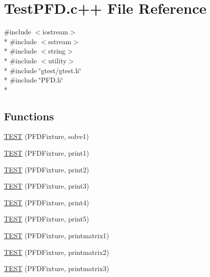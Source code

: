 \hypertarget{TestPFD_8c_09_09}{\section{Test\-P\-F\-D.\-c++ File Reference}
\label{TestPFD_8c_09_09}
}
{\ttfamily \#include $<$iostream$>$}\\*
{\ttfamily \#include $<$sstream$>$}\\*
{\ttfamily \#include $<$string$>$}\\*
{\ttfamily \#include $<$utility$>$}\\*
{\ttfamily \#include \char`\"{}gtest/gtest.\-h\char`\"{}}\\*
{\ttfamily \#include \char`\"{}P\-F\-D.\-h\char`\"{}}\\*
\subsection*{Functions}
\begin{DoxyCompactItemize}
\item 
\hyperlink{TestPFD_8c_09_09_a306e0708d1b40dc0bb6011c54592bb4b}{T\-E\-S\-T} (P\-F\-D\-Fixture, solve1)
\item 
\hyperlink{TestPFD_8c_09_09_a31e2a4aea0a1176053cc53d6d2eac815}{T\-E\-S\-T} (P\-F\-D\-Fixture, print1)
\item 
\hyperlink{TestPFD_8c_09_09_a203f84029df1bcedd6218ffd828581b0}{T\-E\-S\-T} (P\-F\-D\-Fixture, print2)
\item 
\hyperlink{TestPFD_8c_09_09_a72e0ff436e0533faecf551c4cc77adad}{T\-E\-S\-T} (P\-F\-D\-Fixture, print3)
\item 
\hyperlink{TestPFD_8c_09_09_a0e6057b57370ec28f5a0b69070544cf6}{T\-E\-S\-T} (P\-F\-D\-Fixture, print4)
\item 
\hyperlink{TestPFD_8c_09_09_a3d37b737990ebc67e3cd4fbd29193372}{T\-E\-S\-T} (P\-F\-D\-Fixture, print5)
\item 
\hyperlink{TestPFD_8c_09_09_ada7b18270a559c57bf035d547c33116e}{T\-E\-S\-T} (P\-F\-D\-Fixture, printmatrix1)
\item 
\hyperlink{TestPFD_8c_09_09_ada43861a948cfca1b1a96b051263d1cd}{T\-E\-S\-T} (P\-F\-D\-Fixture, printmatrix2)
\item 
\hyperlink{TestPFD_8c_09_09_a300ab3dc6921de0aa239f5b41b0aec68}{T\-E\-S\-T} (P\-F\-D\-Fixture, printmatrix3)
\end{DoxyCompactItemize}



